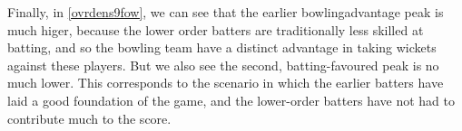 Finally, in \ref{ovrdens9fow}, we can see that the earlier bowlingadvantage peak is much higer, because the lower order batters are traditionally less skilled 
at batting, and so the bowling team have a distinct advantage in taking wickets against these players. But we also see the second, batting-favoured peak is no much lower.
This corresponds to the scenario in which the earlier batters have laid a good foundation of the game, and the lower-order batters have not had to contribute much to the score.